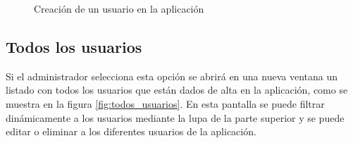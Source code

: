 \begin{figure}[H]
    \centering
    \caption{Creación de un usuario en la aplicación}
    \label{fig:crear_usuario_admin}
\end{figure}


\subsection{Todos los usuarios}
Si el administrador selecciona esta opción se abrirá en una nueva ventana un listado con todos los usuarios que están dados de alta en la aplicación, como se muestra en la figura \ref{fig:todos_usuarios}. En esta pantalla se puede filtrar dinámicamente a los usuarios mediante la lupa de la parte superior y se puede editar o eliminar a los diferentes usuarios de la aplicación.

